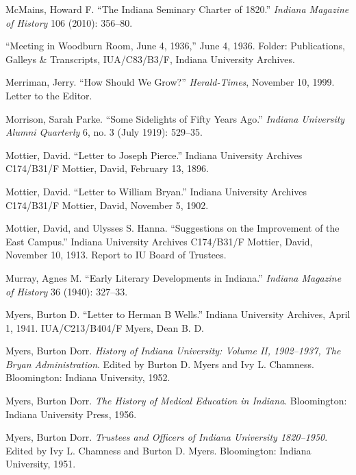 \documentclass[
  american,
  letterpaper,
]{scrreprt}
\newlength{\cslhangindent}
\newenvironment{CSLReferences}[2] %
 {\begin{list}{}{%
  \setlength{\itemindent}{0pt}
  \setlength{\leftmargin}{0pt}
  \setlength{\parsep}{0pt}
  \ifodd #1
   \setlength{\leftmargin}{\cslhangindent}
   \setlength{\itemindent}{-1\cslhangindent}
  \fi
  \setlength{\itemsep}{#2\baselineskip}}}
 {\end{list}}
\begin{document}
\begin{CSLReferences}{1}{0}
McMains, Howard F. {``The Indiana Seminary Charter of 1820.''}
\emph{Indiana Magazine of History} 106 (2010): 356--80.

{``Meeting in Woodburn Room, June 4, 1936,''} June 4, 1936. Folder:
Publications, Galleys \& Transcripts, IUA/C83/B3/F, Indiana University
Archives.

Merriman, Jerry. {``How Should We Grow?''} \emph{Herald-Times}, November
10, 1999. Letter to the Editor.

Morrison, Sarah Parke. {``Some Sidelights of Fifty Years Ago.''}
\emph{Indiana University Alumni Quarterly} 6, no. 3 (July 1919):
529--35.

Mottier, David. {``Letter to Joseph Pierce.''} Indiana University
Archives C174/B31/F Mottier, David, February 13, 1896.

Mottier, David. {``Letter to William Bryan.''} Indiana University
Archives C174/B31/F Mottier, David, November 5, 1902.

Mottier, David, and Ulysses S. Hanna. {``Suggestions on the Improvement
of the East Campus.''} Indiana University Archives C174/B31/F Mottier,
David, November 10, 1913. Report to IU Board of Trustees.

Murray, Agnes M. {``Early Literary Developments in Indiana.''}
\emph{Indiana Magazine of History} 36 (1940): 327--33.

Myers, Burton D. {``Letter to Herman {B} Wells.''} Indiana University
Archives, April 1, 1941. IUA/C213/B404/F Myers, Dean B. D.

Myers, Burton Dorr. \emph{History of Indiana University: Volume {II},
1902--1937, {The} Bryan Administration}. Edited by Burton D. Myers and
Ivy L. Chamness. Bloomington: Indiana University, 1952.

Myers, Burton Dorr. \emph{The History of Medical Education in Indiana}.
Bloomington: Indiana University Press, 1956.

Myers, Burton Dorr. \emph{Trustees and Officers of Indiana University
1820--1950}. Edited by Ivy L. Chamness and Burton D. Myers. Bloomington:
Indiana University, 1951.


\end{CSLReferences}
\end{document}
